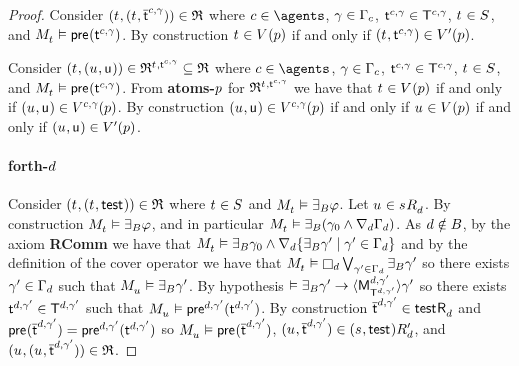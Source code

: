 \begin{proof}
Consider $(\kStateT, (\kStateT, \aPStateT[\agentC, \gamma])) \in \refinement$ where $\agentC \in \agents$, $\gamma \in \Gamma_\agentC$, $\aStateT[\agentC, \gamma] \in \aStatesT[\agentC, \gamma]$, $\kStateT \in \kStates$, and $\kPModel{\kStateT} \entails \aPrecondition(\aStateT[\agentC, \gamma])$.
By construction $\kStateT \in \kValuation(\atomP)$ if and only if $(\kStateT, \aStateT[\agentC, \gamma]) \in \kValuationP(\atomP)$.

Consider $(\kStateT, (\kStateU, \aStateU)) \in \refinement^{\kStateT, \aStateT[\agentC, \gamma]} \subseteq \refinement$ where $\agentC \in \agents$, $\gamma \in \Gamma_\agentC$, $\aStateT[\agentC, \gamma] \in \aStatesT[\agentC, \gamma]$, $\kStateT \in \kStates$, and $\kPModel{\kStateT} \entails \aPrecondition(\aStateT[\agentC, \gamma])$.
From {\bf atoms-$\atomP$} for $\refinement^{\kStateT, \aStateT[\agentC, \gamma]}$ we have that $\kStateT \in \kValuation(\atomP)$ if and only if $(\kStateU, \aStateU) \in \kValuation[\agentC, \gamma](\atomP)$.
By construction $(\kStateU, \aStateU) \in \kValuation[\agentC, \gamma](\atomP)$ if and only if $\kStateU \in \kValuation(\atomP)$ if and only if $(\kStateU, \aStateU) \in \kValuationP(\atomP)$.

\paragraph{forth-$\agentD$}
Consider $(\kStateT, (\kStateT, \aStateTest)) \in \refinement$ where $\kStateT \in \kStates$ and $\kPModel{\kStateT} \entails \someactsBs \phi$.
Let $\kStateU \in \kSuccessorsD{\kStateS}$.
By construction $\kPModel{\kStateT} \entails \someactsBs \phi$, and in particular $\kPModel{\kStateT} \entails \someactsBs (\gamma_0 \land \coversD \Gamma_\agentD)$.
As $\agentD \notin \agentsB$, by the \axiomAamlS{} axiom {\bf RComm} we have that $\kPModel{\kStateT} \entails \someactsBs \gamma_0 \land \coversD \{\someactsBs \gamma' \mid \gamma' \in \Gamma_\agentD\}$ and by the definition of the cover operator we have that $\kPModel{\kStateT} \entails \necessaryD \bigvee_{\gamma' \in \Gamma_\agentD} \someactsBs \gamma'$ so there exists $\gamma' \in \Gamma_\agentD$ such that $\kPModel{\kStateU} \entails \someactsBs \gamma'$.
By hypothesis $\entails \someactsBs \gamma' \implies \actionE{\aPModel[\agentD, \gamma']{\aStatesT[\agentD, \gamma']}} \gamma'$ so there exists $\aStateT[\agentD, \gamma'] \in \aStatesT[\agentD, \gamma']$ such that $\kPModel{\kStateU} \entails \aPrecondition[\agentD, \gamma'](\aStateT[\agentD, \gamma'])$.
By construction $\aPStateT[\agentD, \gamma'] \in \aSuccessorsD{\aStateTest}$ and $\aPrecondition(\aPStateT[\agentD, \gamma']) = \aPrecondition[\agentD, \gamma'](\aStateT[\agentD, \gamma'])$ so $\kPModel{\kStateU} \entails \aPrecondition(\aPStateT[\agentD, \gamma'])$, $(\kStateU, \aPStateT[\agentD, \gamma']) \in \kSuccessorsPD{(\kStateS, \aStateTest)}$, and $(\kStateU, (\kStateU, \aPStateT[\agentD, \gamma'])) \in \refinement$.


\end{proof}
